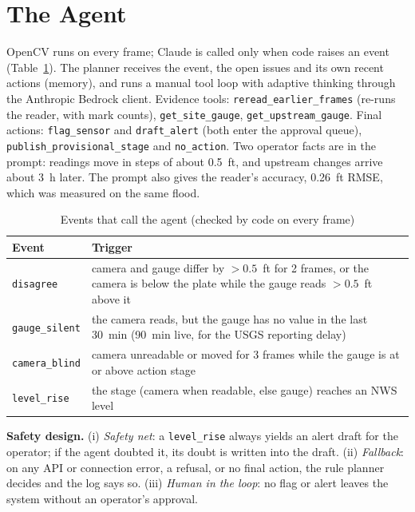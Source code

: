 \documentclass[conference,10pt,letterpaper]{IEEEtran}
\begin{document}
\section{The Agent}
OpenCV runs on every frame; Claude is called only when code raises an event
(Table~\ref{tab:events}). The planner receives the event, the open issues and its own recent
actions (memory), and runs a manual tool loop with adaptive thinking through the Anthropic
Bedrock client. Evidence tools: \texttt{reread\_earlier\_frames} (re-runs the reader, with mark
counts), \texttt{get\_site\_gauge}, \texttt{get\_upstream\_gauge}. Final actions:
\texttt{flag\_sensor} and \texttt{draft\_alert} (both enter the approval queue),
\texttt{publish\_provisional\_stage} and \texttt{no\_action}. Two operator facts are in the
prompt: readings move in steps of about 0.5~ft, and upstream changes arrive about 3~h later. The
prompt also gives the reader's accuracy, 0.26~ft RMSE, which was measured on the same flood.

\begin{table}[t]
\caption{Events that call the agent (checked by code on every frame)}
\label{tab:events}
\centering\footnotesize
\setlength{\tabcolsep}{4pt}
\begin{tabular}{@{}lp{6.1cm}@{}}
\toprule
Event & Trigger\\
\midrule
\texttt{disagree} & camera and gauge differ by $>0.5$~ft for 2 frames, or the camera is below the plate while the gauge reads $>0.5$~ft above it\\
\texttt{gauge\_silent} & the camera reads, but the gauge has no value in the last 30~min (90~min live, for the USGS reporting delay)\\
\texttt{camera\_blind} & camera unreadable or moved for 3 frames while the gauge is at or above action stage\\
\texttt{level\_rise} & the stage (camera when readable, else gauge) reaches an NWS level\\
\bottomrule
\end{tabular}
\end{table}

\textbf{Safety design.} (i) \emph{Safety net}: a \texttt{level\_rise} always yields an alert
draft for the operator; if the agent doubted it, its doubt is written into the draft.
(ii) \emph{Fallback}: on any API or connection error, a refusal, or no final action, the rule
planner decides and the log says so. (iii) \emph{Human in the loop}: no flag or alert leaves the
system without an operator's approval.
\end{document}
